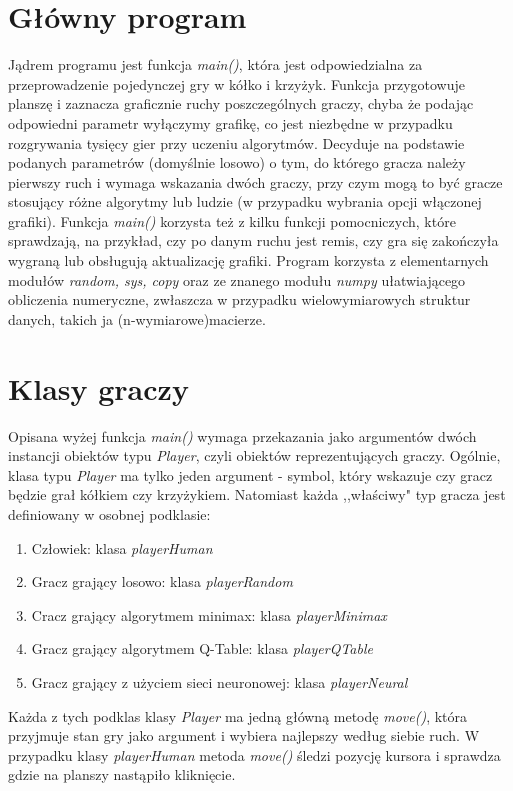 \documentclass[licencjacka]{pracamgr}
\begin{document}
\section{Główny program}
Jądrem programu jest funkcja \textit{main()}, która jest odpowiedzialna za przeprowadzenie pojedynczej gry w kółko i krzyżyk. Funkcja przygotowuje planszę i zaznacza graficznie ruchy poszczególnych graczy, chyba że podając odpowiedni parametr wyłączymy grafikę, co jest niezbędne w przypadku rozgrywania tysięcy gier przy uczeniu algorytmów. Decyduje na podstawie podanych parametrów (domyślnie losowo) o tym, do którego gracza należy pierwszy ruch i wymaga wskazania dwóch graczy, przy czym mogą to być gracze stosujący różne algorytmy lub ludzie (w przypadku wybrania opcji włączonej grafiki). Funkcja \textit{main()} korzysta też z kilku funkcji pomocniczych, które sprawdzają, na przykład, czy po danym ruchu jest remis, czy gra się zakończyła wygraną  lub obsługują aktualizację grafiki. Program korzysta z elementarnych modułów \textit{random, sys, copy} oraz ze znanego modułu \textit{numpy} ułatwiającego obliczenia numeryczne, zwłaszcza w przypadku wielowymiarowych struktur danych, takich ja (n-wymiarowe)macierze.  

\section{Klasy graczy}
Opisana wyżej funkcja \textit{main()} wymaga przekazania jako argumentów dwóch instancji obiektów typu \textit{Player}, czyli obiektów reprezentujących graczy. Ogólnie, klasa typu \textit{Player} ma tylko jeden argument - symbol, który wskazuje czy gracz będzie grał kółkiem czy krzyżykiem. Natomiast każda ,,właściwy" typ gracza jest definiowany w osobnej podklasie:
\begin{enumerate}
	\item{Człowiek: klasa \textit{playerHuman}}
	\item{Gracz grający losowo: klasa \textit{playerRandom}}	
	\item{Cracz grający algorytmem minimax: klasa \textit{playerMinimax}}
	\item{Gracz grający algorytmem Q-Table: klasa \textit{playerQTable}}
	\item{Gracz grający z użyciem sieci neuronowej: klasa \textit{playerNeural}}
\end{enumerate}
Każda z tych podklas klasy \textit{Player} ma jedną główną metodę \textit{move()}, która przyjmuje stan  gry jako argument i wybiera najlepszy według siebie ruch. W przypadku klasy \textit{playerHuman} metoda \textit{move()} śledzi pozycję kursora i sprawdza gdzie na  planszy nastąpiło kliknięcie.  \\
\end{document}
